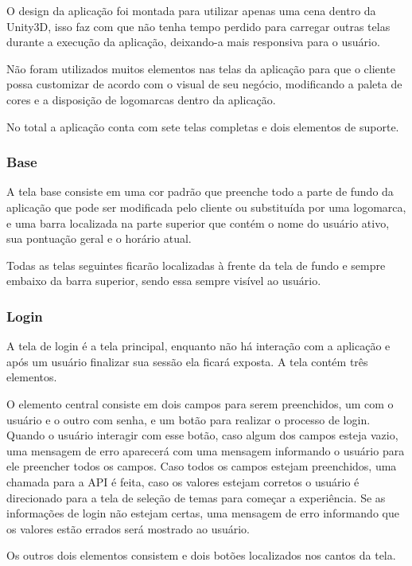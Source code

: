 O design da aplicação foi montada para utilizar apenas uma cena dentro da Unity3D, isso faz com que não tenha tempo perdido para carregar outras telas durante a execução da aplicação, deixando-a mais responsiva para o usuário.

Não foram utilizados muitos elementos nas telas da aplicação para que o cliente possa customizar de acordo com o visual de seu negócio, modificando a paleta de cores e a disposição de logomarcas dentro da aplicação.

No total a aplicação conta com sete telas completas e dois elementos de suporte.

\subsubsection{Base}
\label{subsubsec:base}

A tela base consiste em uma cor padrão que preenche todo a parte de fundo da aplicação que pode ser modificada pelo cliente ou substituída por uma logomarca, e uma barra localizada na parte superior que contém o nome do usuário ativo, sua pontuação geral e o horário atual.

Todas as telas seguintes ficarão localizadas à frente da tela de fundo e sempre embaixo da barra superior, sendo essa sempre visível ao usuário.

\subsubsection{Login}
\label{subsubsec:login}

A tela de login é a tela principal, enquanto não há interação com a aplicação e após um usuário finalizar sua sessão ela ficará exposta. A tela contém três elementos.
    
O elemento central consiste em dois campos para serem preenchidos, um com o usuário e o outro com senha, e um botão para realizar o processo de login. Quando o usuário interagir com esse botão, caso algum dos campos esteja vazio, uma mensagem de erro aparecerá com uma mensagem informando o usuário para ele preencher todos os campos. Caso todos os campos estejam preenchidos, uma chamada para a API é feita, caso os valores estejam corretos o usuário é direcionado para a tela de seleção de temas para começar a experiência. Se as informações de login não estejam certas, uma mensagem de erro informando que os valores estão errados será mostrado ao usuário.

Os outros dois elementos consistem e dois botões localizados nos cantos da tela.
    
